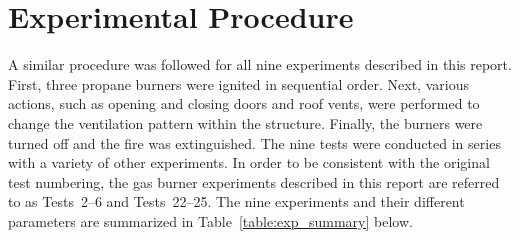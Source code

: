 
\renewcommand{\thechapter}{3}

\chapter{Experimental Procedure}
\label{chap:exp_procedure}

A similar procedure was followed for all nine experiments described in this report. First, three propane burners were ignited in sequential order. Next, various actions, such as opening and closing doors and roof vents, were performed to change the ventilation pattern within the structure. Finally, the burners were turned off and the fire was extinguished. The nine tests were conducted in series with a variety of other experiments. In order to be consistent with the original test numbering, the gas burner experiments described in this report are referred to as Tests~2--6 and Tests~22--25. The nine experiments and their different parameters are summarized in Table~\ref{table:exp_summary} below.

